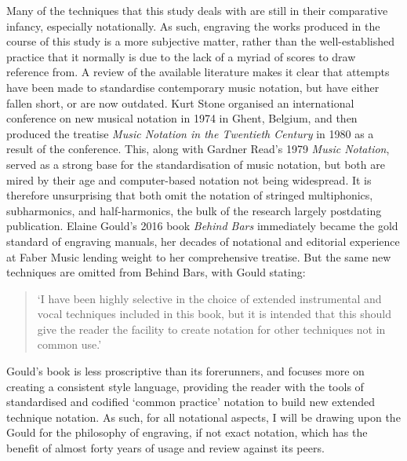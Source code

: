 Many of the techniques that this study deals with are still in their comparative infancy, especially notationally.
As such, engraving the works produced in the course of this study is a more subjective matter, rather than the well-established practice that it normally is due to the lack of a myriad of scores to draw reference from. 
A review of the available literature makes it clear that attempts have been made to standardise contemporary music notation, but have either fallen short, or are now outdated. 
Kurt Stone organised an international conference on new musical notation in 1974 in Ghent, Belgium, and then produced the treatise \emph{Music Notation in the Twentieth Century} in 1980 as a result of the conference.\autocite[xiii]{stoneMusicNotationTwentieth1980} 
This, along with Gardner Read’s 1979 \emph{Music Notation}, served as a strong base for the standardisation of music notation, but both are mired by their age and computer-based notation not being widespread.\autocite{readCompendiumModernInstrumental1993} 
It is therefore unsurprising that both omit the notation of stringed multiphonics, subharmonics, and half-harmonics, the bulk of the research largely postdating publication. 
Elaine Gould’s 2016 book \emph{Behind Bars} immediately became the gold standard of engraving manuals, her decades of notational and editorial experience at Faber Music lending weight to her comprehensive treatise.\autocite[]{gouldBars2011} 
But the same new techniques are omitted from Behind Bars, with Gould stating: 
\begin{quotation}
 ‘I have been highly selective in the choice of extended instrumental and vocal techniques included in this book, but it is intended that this should give the reader the facility to create notation for other techniques not in common use.’\autocite[iii]{gouldBars2011} 
\end{quotation}
Gould’s book is less proscriptive than its forerunners, and focuses more on creating a consistent style language, providing the reader with the tools of standardised and codified ‘common practice’ notation to build new extended technique notation. 
As such, for all notational aspects, I will be drawing upon the Gould for the philosophy of engraving, if not exact notation, which has the benefit of almost forty years of usage and review against its peers.

